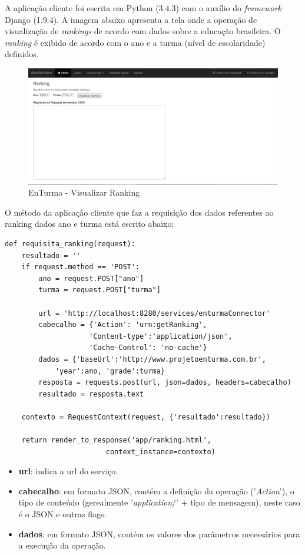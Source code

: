 A aplicação cliente foi escrita em Python (3.4.3) com o auxílio do \textit{framework} Django (1.9.4). A imagem abaixo apresenta a tela onde a operação de visualização de \textit{rankings} de acordo com dados sobre a educação brasileira. O \textit{ranking} é exibido de acordo com o ano e a turma (nível de escolaridade) definidos.

\begin{figure}[htb]
\centering
\includegraphics[width=1.0\textwidth]{figuras/visualizar_ranking_embranco.PNG}
\caption{EnTurma - Visualizar Ranking}
\label{visualizar_ranking_embranco}
\end{figure}

O método da aplicação cliente que faz a requisição dos dados referentes ao ranking dados ano e turma está escrito abaixo:

\lstset{language=Python}
\begin{lstlisting}
def requisita_ranking(request):
    resultado = ''
    if request.method == 'POST':
        ano = request.POST["ano"]
        turma = request.POST["turma"]

        url = 'http://localhost:8280/services/enturmaConnector'
        cabecalho = {'Action': 'urn:getRanking', 
                    'Content-type':'application/json',
                    'Cache-Control': 'no-cache'}
        dados = {'baseUrl':'http://www.projetoenturma.com.br',
        	'year':ano, 'grade':turma}
        resposta = requests.post(url, json=dados, headers=cabecalho)
        resultado = resposta.text        
        
    contexto = RequestContext(request, {'resultado':resultado})

    return render_to_response('app/ranking.html', 
    					context_instance=contexto)
\end{lstlisting}

\begin{itemize}
\item \textbf{url}: indica a url do serviço.
\item \textbf{cabecalho}: em formato JSON, contém a definição da operação ('\textit{Action}'), o tipo de conteúdo (gerealmente '\textit{application}/' + tipo de mensagem), neste caso é o JSON e outras flags.
\item \textbf{dados}: em formato JSON, contém os valores dos parâmetros necessários para a execução da operação.
\end{itemize}

